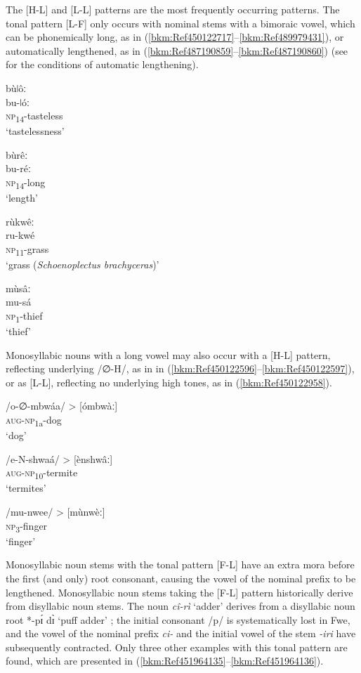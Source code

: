The [H-L] and [L-L] patterns are the most frequently occurring patterns. The tonal pattern [L-F] only occurs with nominal stems with a bimoraic vowel, which can be phonemically long, as in (\ref{bkm:Ref450122717}--\ref{bkm:Ref489979431}), or automatically lengthened, as in (\ref{bkm:Ref487190859}--\ref{bkm:Ref487190860}) (see  for the conditions of automatic lengthening).

\ea
\label{bkm:Ref450122717}
\glll bùǀôː\\
bu-ǀóː\\
\textsc{np}\textsubscript{14}-tasteless\\
\glt ‘tastelessness’
\z

\ea
\label{bkm:Ref489979431}
\glll bùrêː\\
bu-réː\\
\textsc{np}\textsubscript{14}-long\\
\glt ‘length’
\z

\ea
\label{bkm:Ref487190859}
\glll rùkwêː\\
ru-kwé\\
\textsc{np}\textsubscript{11}-grass\\
\glt ‘grass (\textit{Schoenoplectus brachyceras})’
\z

\ea
\label{bkm:Ref487190860}
\glll mùsâː\\
mu-sá\\
\textsc{np}\textsubscript{1}-thief\\
\glt ‘thief’
\z

Monosyllabic nouns with a long vowel may also occur with a [H-L] pattern, reflecting underlying /∅-H/, as in in (\ref{bkm:Ref450122596}--\ref{bkm:Ref450122597}), or as [L-L], reflecting no underlying high tones, as in (\ref{bkm:Ref450122958}).

\ea
\label{bkm:Ref450122596}
/o-∅-mbwáa/ > [ómbwàː]\\
\textsc{aug}-\textsc{np}\textsubscript{1a}-dog\\
\glt ‘dog’
\z

\ea
\label{bkm:Ref450122597}
/e-N-shwaá/ > [ènshwâː]\\
\textsc{aug}-\textsc{np}\textsubscript{10}-termite\\
\glt ‘termites’
\z

\ea
\label{bkm:Ref450122958}
/mu-nwee/ > [mùnwèː]\\
\textsc{np}\textsubscript{3}-finger\\
\glt ‘finger’
\z

Monosyllabic noun stems with the tonal pattern [F-L] have an extra mora before the first (and only) root consonant, causing the vowel of the nominal prefix to be lengthened. Monosyllabic noun stems taking the [F-L] pattern historically derive from disyllabic noun stems. The noun \textit{cî-rì} ‘adder’ derives from a disyllabic noun root *-p\'{ɪ} d\`{ɪ}  ‘puff adder’ \citep{BastinEtAl2002}; the initial consonant /p/ is systemati\-cally lost in Fwe, and the vowel of the nominal prefix \textit{ci-} and the initial vowel of the stem \textit{-iri} have subsequently contracted. Only three other examples with this tonal pattern are found, which are presented in (\ref{bkm:Ref451964135}--\ref{bkm:Ref451964136}).

